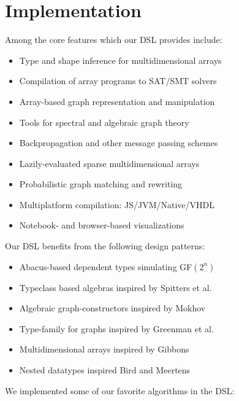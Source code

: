 \documentclass[sigplan,10pt,review,anonymous]{acmart}
\begin{document}
\section{Implementation}

Among the core features which our DSL provides include:

\begin{itemize}
  \item Type and shape inference for multidimensional arrays
  \item Compilation of array programs to SAT/SMT solvers
  \item Array-based graph representation and manipulation
  \item Tools for spectral and algebraic graph theory
  \item Backpropagation and other message passing schemes
  \item Lazily-evaluated sparse multidimensional arrays
  \item Probabilistic graph matching and rewriting
  \item Multiplatform compilation: JS/JVM/Native/VHDL
  \item Notebook- and browser-based visualizations
\end{itemize}

\noindent Our DSL benefits from the following design patterns:

\begin{itemize}
  \item Abacus-based dependent types simulating GF$(2^n)$
  \item Typeclass based algebras inspired by Spitters et al.~\citep{spitters2011type}
  \item Algebraic graph-constructors inspired by Mokhov~\citep{mokhov2017algebraic}
  \item Type-family for graphs inspired by Greenman et al.~\citep{greenman2014getting}
  \item Multidimensional arrays inspired by Gibbons~\citep{gibbons2017aplicative}
  \item Nested datatypes inspired Bird and Meertens~\cite{bird1998nested}
\end{itemize}

\noindent We implemented some of our favorite algorithms in the DSL:
\end{document}
